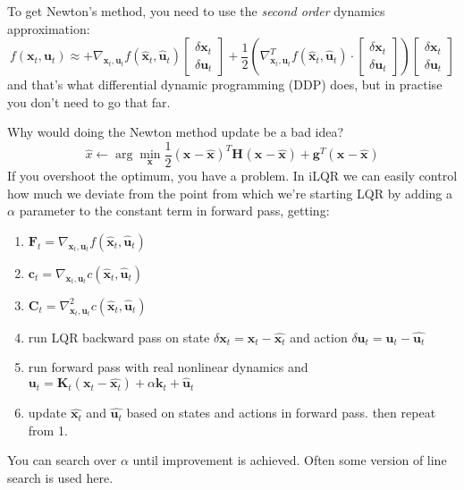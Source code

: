 \documentclass{report}
\newcommand{\argmin}{\arg\!\min}
\begin{document}
To get Newton's method, you need to use the \textit{second order} dynamics approximation:
\begin{equation}
f (\bm{x}_{t}, \bm{u}_{t} ) \approx +
\nabla_{ \bm{x}_{t}, \bm{u}_{t} } f (\hat{\bm{x}}_{t}, \hat{\bm{u}}_{t} )
\begin{bmatrix} \delta \bm{x}_{t} \\ \delta \bm{u}_{t} \end{bmatrix} + \frac{1}{2}
\left( \nabla_{ \bm{x}_{t}, \bm{u}_{t} }^{ T } f (\hat{\bm{x}}_{t}, \hat{\bm{u}}_{t} )
\cdot  \begin{bmatrix} \delta \bm{x}_{t} \\ \delta \bm{u}_{t} \end{bmatrix}\right) 
\begin{bmatrix} \delta \bm{x}_{t} \\ \delta \bm{u}_{t} \end{bmatrix}
\end{equation}
and that's what differential dynamic programming (DDP) does,
but in practise you don't need to go that far.

Why would doing the Newton method update be a bad idea?
\begin{equation}
		 \hat{x} \leftarrow \argmin_{\bm{x}_{}} \frac{1}{2} 
				(\bm{x}_{} - \hat{\bm{x}_{}})^{ T } \bm{H}_{} (\bm{x}_{} -\hat{\bm{x}_{}})
				+ \bm{g}_{}^{ T } (\bm{x}_{} -\hat{\bm{x}_{}})
\end{equation}
If you overshoot the optimum, you have a problem.
In iLQR we can easily control how much we deviate from the point from which we're starting LQR by 
adding a $ \alpha  $ parameter to the constant term in forward pass, getting:
\begin{enumerate}
\item $ \bm{F}_{t} = \nabla_{ \bm{x}_{t}, \bm{u}_{t} } f (\hat{\bm{x}}_{t}, \hat{\bm{u}}_{t} )  $
\item $ \bm{c}_{t} = \nabla_{ \bm{x}_{t}, \bm{u}_{t} } c (\hat{\bm{x}}_{t}, \hat{\bm{u}}_{t} )  $
\item $ \bm{C}_{t} = \nabla_{ \bm{x}_{t}, \bm{u}_{t} }^{ 2 } c (\hat{\bm{x}}_{t}, \hat{\bm{u}}_{t} )  $
\item run LQR backward pass on state $ \delta\bm{x}_{t} = \bm{x}_{t} - \hat{\bm{x}_{t}}  $
		and action $ \delta \bm{u}_{t} = \bm{u}_{t} - \hat{\bm{u}_{t}}  $
\item run forward pass with real nonlinear dynamics and $ \bm{u}_{t} =
		\bm{K}_{t} (\bm{x}_{t} - \hat{\bm{x}_{t}}) + \alpha \bm{k}_{t} + \hat{\bm{u}}_{t}$
\item update $ \hat{\bm{x}_{t}}  $ and $ \hat{\bm{u}_{t}}  $ based on states
		and actions in forward pass. then repeat from 1.
\end{enumerate}
You can search over $ \alpha  $ until improvement is achieved. Often
some version of line search is used here.
\end{document}

